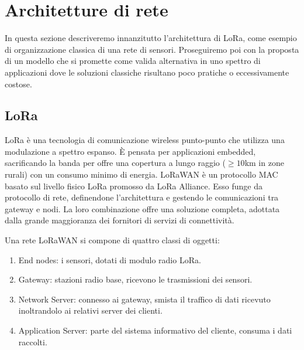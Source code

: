 \documentclass[a4paper,12pt]{article}
\theoremstyle{definition}
\begin{document}

\section{Architetture di rete}

In questa sezione descriveremo innanzitutto l'architettura di LoRa, come esempio di organizzazione classica di una rete di sensori. Proseguiremo poi con la proposta di un modello che si promette come valida alternativa in uno spettro di applicazioni dove le soluzioni classiche risultano poco pratiche o eccessivamente costose.

\subsection{LoRa}



LoRa è una tecnologia di comunicazione wireless punto-punto che utilizza una modulazione a spettro espanso. È pensata per applicazioni embedded, sacrificando la banda per offre una copertura a lungo raggio ($\geq 10$km in zone rurali) con un consumo minimo di energia. LoRaWAN è un protocollo MAC basato sul livello fisico LoRa promosso da LoRa Alliance. Esso funge da protocollo di rete, definendone l'architettura e gestendo le comunicazioni tra gateway e nodi. La loro combinazione offre una soluzione completa, adottata dalla grande maggioranza dei fornitori di servizi di connettività.

Una rete LoRaWAN si compone di quattro classi di oggetti:

\begin{enumerate}
\item End nodes: i sensori, dotati di modulo radio LoRa.
\item Gateway: stazioni radio base, ricevono le trasmissioni dei sensori.
\item Network Server: connesso ai gateway, smista il traffico di dati ricevuto inoltrandolo ai relativi server dei clienti.
\item Application Server: parte del sistema informativo del cliente, consuma i dati raccolti.
\end{enumerate}
\end{document}
